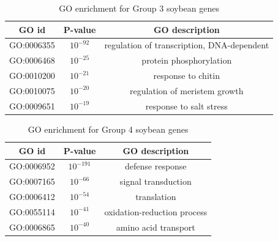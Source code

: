 \documentclass{article}
\begin{document}
		\begin{table}[h!]
			\centering
			\begin{tabular}{|c |c |c |} 
				\hline
				GO id & P-value & GO description \\
				\hline\hline
				GO:0006355 & $10^{-92}$ & regulation of transcription, DNA-dependent \\ 
				\hline
				GO:0006468 & $10^{-25}$ & protein phosphorylation \\
				\hline
				GO:0010200 & $10^{-21}$ & response to chitin \\
				\hline
				GO:0010075 & $10^{-20}$ & regulation of meristem growth \\
				\hline
				GO:0009651 & $10^{-19}$ & response to salt stress \\ 
				\hline
			\end{tabular}
			\caption{GO enrichment for Group 3 soybean genes}
			\label{tab:gotable_group3}
		\end{table}
		
		\begin{table}[h!]
			\centering
			\begin{tabular}{|c |c |c |} 
				\hline
				GO id & P-value & GO description \\
				\hline\hline
				GO:0006952 & $10^{-191}$ & defense response \\ 
				\hline
				GO:0007165 & $10^{-66}$ & signal transduction \\
				\hline
				GO:0006412 & $10^{-54}$ & translation \\
				\hline
				GO:0055114 & $10^{-41}$ & oxidation-reduction process \\
				\hline
				GO:0006865 & $10^{-40}$ & amino acid transport \\ 
				\hline
			\end{tabular}
			\caption{GO enrichment for Group 4 soybean genes}
			\label{tab:gotable_group4}
		\end{table}

	\pagebreak
	
	
	
	
	
\end{document}
